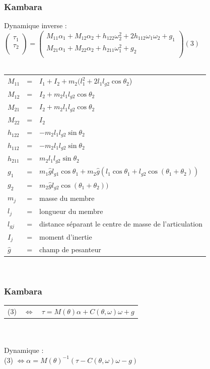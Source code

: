 \documentclass{beamer}
\begin{document}
\begin{frame}
\frametitle{Kambara}
Dynamique inverse : \\
$
\begin{pmatrix}
    \tau_1 \\
    \tau_2 \\
\end{pmatrix}
=
\begin{pmatrix}
    M_{11}\alpha_1 + M_{12}\alpha_2 + h_{122}\omega_2^2 + 2h_{112}\omega_1\omega_2 + g_1 \\
    M_{21}\alpha_1 + M_{22}\alpha_2 + h_{211}\omega_1^2 + g_2 \\
\end{pmatrix}
(3)$\\
~\\
\begin{tabular}{lcl}
    $M_{11}$ & = & $I_1 + I_2 + m_2(l_1^2 + 2 l_1 l_{g2}\cos\theta_2$) \\
    $M_{12}$ & = & $I_2 + m_2l_1l_{g2}\cos\theta_2$ \\
    $M_{21}$ & = & $I_2 + m_2l_1l_{g2}\cos\theta_2$ \\
    $M_{22}$ & = & $I_2$ \\
    $h_{122}$ & = & $-m_2 l_1 l_{g2} \sin\theta_2$ \\
    $h_{112}$ & = & $-m_2 l_1 l_{g2} \sin\theta_2$ \\
    $h_{211}$ & = & $m_2 l_1 l_{g2} \sin\theta_2$ \\
    $g_1$ & = & $m_1 \hat{g} l_{g1} \cos\theta_1 + m_2 \hat{g} (l_1 \cos\theta_1 + l_{g2} \cos(\theta_1 + \theta_2))$ \\
    $g_2$ & = & $m_2 \hat{g} l_{g2} \cos(\theta_1 + \theta_2))$ \\
    $m_j$ & = & masse du membre \\
    $l_j$ & = & longueur du membre \\
    $l_{gj}$ & = & distance séparant le centre de masse de l'articulation \\
    $I_{j}$ & = & moment d'inertie \\
    $\hat{g}$ & = & champ de pesanteur \\
\end{tabular}\\
\end{frame}

\begin{frame}
\frametitle{Kambara}
\begin{tabular}{lcl}
    (3) & $\Leftrightarrow$ & $\tau = M(\theta)\alpha + C(\theta, \omega) \omega + g$ \\
\end{tabular}\\
~\\
Dynamique :\\
(3) $\Leftrightarrow \alpha = M(\theta)^{-1} (\tau - C(\theta, \omega) \omega - g) $
\end{frame}
\end{document}
